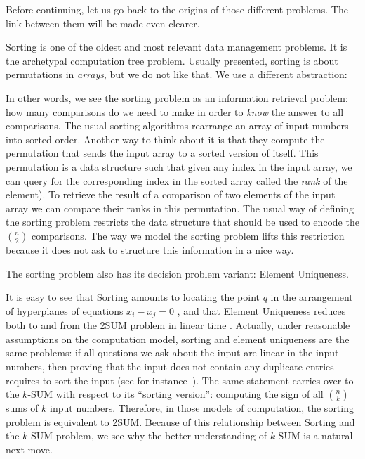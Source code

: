 
Before continuing, let us go back to the origins of those different problems.
The link between them will be made even clearer.

Sorting is one of the oldest and most relevant data management problems.
It is the archetypal computation tree problem.
%
Usually presented, sorting is about permutations in \emph{arrays}, but we do
not like that. We use a different abstraction:
%


In other words, we see the sorting problem as an information retrieval problem:
how many comparisons do we need to make in order to \emph{know} the answer to
all comparisons.
%
The usual sorting algorithms rearrange an array of input numbers into sorted
order. Another way to think about it is that they compute the permutation that
sends the input array to a sorted version of itself. This permutation is a data
structure such that given any index in the input array, we can query for the
corresponding index in the sorted array called the \emph{rank} of the element).
To retrieve the result of a comparison of two elements of the input array we can
compare their ranks in this permutation.
%
The usual way of defining the sorting problem restricts the data structure that
should be used to encode the \(n \choose 2\) comparisons.
The way we model the sorting problem lifts this restriction because it does not
ask to structure this information in a nice way.

The sorting problem also has its decision problem variant: Element Uniqueness.
%


It is easy to see
%
that Sorting amounts to locating the point \(q\) in
the arrangement of hyperplanes of equations \(x_i - x_j = 0\)%
%
, and
%
that Element Uniqueness reduces both to and from the 2SUM
problem in linear time%
.
%
Actually, under reasonable assumptions on the computation model, sorting and
element uniqueness are the same problems: if all questions we ask about the
input are linear in the input numbers, then proving that the input
does not contain any duplicate entries requires to sort the input (see for
instance~\cite[Section~4]{DL79}).
%
The same statement carries over to the \(k\)-SUM with respect to its ``sorting
version'': computing the sign of all \(n \choose k\) sums of \(k\) input
numbers.
%
Therefore, in those models of computation, the sorting problem is equivalent to
2SUM.
%
Because of this relationship between Sorting and the \(k\)-SUM problem,
we see why the better understanding of \(k\)-SUM is a natural next move.

